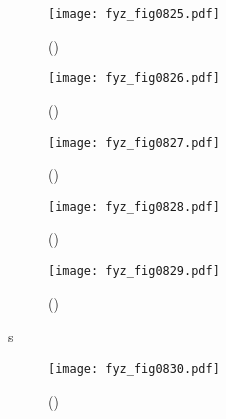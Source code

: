     \begin{figure}[ht!] %
      \centering
      \texttt{[image: fyz\_fig0825.pdf]}
      \caption{
               (\cite[s.~707]{Feynman02})}
      \label{fyz:fig0825}
    \end{figure}

    \begin{figure}[ht!] %
      \centering
      \texttt{[image: fyz\_fig0826.pdf]}
      \caption{
               (\cite[s.~707]{Feynman02})}
      \label{fyz:fig0826}
    \end{figure}

    \begin{figure}[ht!] %
      \centering
      \texttt{[image: fyz\_fig0827.pdf]}
      \caption{
               (\cite[s.~707]{Feynman02})}
      \label{fyz:fig0827}
    \end{figure}

    \begin{figure}[ht!] %
      \centering
      \texttt{[image: fyz\_fig0828.pdf]}
      \caption{
               (\cite[s.~707]{Feynman02})}
      \label{fyz:fig0828}
    \end{figure}

    \begin{figure}[ht!] %
      \centering
      \texttt{[image: fyz\_fig0829.pdf]}
      \caption{
               (\cite[s.~707]{Feynman02})}
      \label{fyz:fig0829}
    \end{figure}
s
    \begin{figure}[ht!] %
      \centering
      \texttt{[image: fyz\_fig0830.pdf]}
      \caption{
               (\cite[s.~707]{Feynman02})}
      \label{fyz:fig0830}
    \end{figure}


